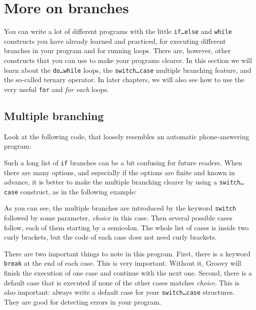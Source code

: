 
\section{More on branches}
\label{sec:more-branches-loops}

You can write a lot of different programs with the little
\texttt{if\ldots else} and \texttt{while} constructs you have already
learned and practiced, for executing different branches in your
program and for running loops. There are, however, other constructs
that you can use to make your programs clearer. In this section we
will learn about the \texttt{do\ldots while} loops, the
\texttt{switch\ldots case} multiple branching feature, and the
so-called ternary operator. In later chapters, we will also see how to
use the very useful \texttt{for} and \emph{for each} loops. 

\subsection{Multiple branching}
\label{sec:multiple-branching}

Look at the following code, that loosely resembles an automatic
phone-answering program:


Such a long list of \texttt{if} branches can be a bit confusing for
future readers. When there are many options, and especially if the
options are finite and known in advance, it is better to make the
multiple branching clearer by using a \texttt{switch\ldots case}
construct, as in the following example:


As you can see, the multiple branches are introduced by the keyword
\texttt{switch} followed by some parameter, \emph{choice} in this
case. Then several possible cases follow, each of them starting by a
semicolon. The whole list of cases is inside two curly brackets, but
the code of each case does not need curly brackets. 

There are two important things to note in this program. First, there
is a keyword \texttt{break} at the end of each case. This is very
important. Without it, Groovy will finish the execution of one case
and continue with the next one. Second, there is a default case that
is executed if none of the other cases matches \emph{choice}. This is
also important: always write a default case for your
\texttt{switch\ldots case} structures. They are good for detecting
errors in your program. 

